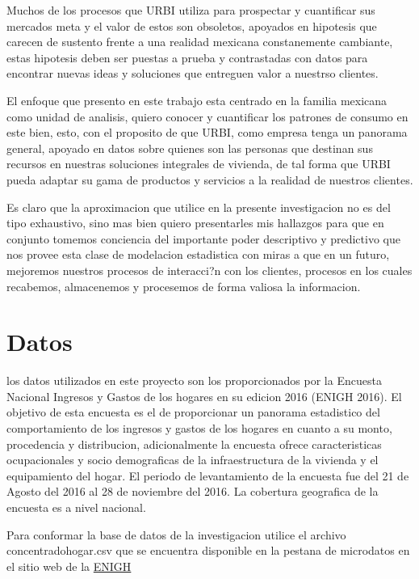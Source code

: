 \documentclass[]{book}
\begin{document}
Muchos de los procesos que URBI utiliza para prospectar y cuantificar
sus mercados meta y el valor de estos son obsoletos, apoyados en
hipotesis que carecen de sustento frente a una realidad mexicana
constanemente cambiante, estas hipotesis deben ser puestas a prueba y
contrastadas con datos para encontrar nuevas ideas y soluciones que
entreguen valor a nuestrso clientes.

El enfoque que presento en este trabajo esta centrado en la familia
mexicana como unidad de analisis, quiero conocer y cuantificar los
patrones de consumo en este bien, esto, con el proposito de que URBI,
como empresa tenga un panorama general, apoyado en datos sobre quienes
son las personas que destinan sus recursos en nuestras soluciones
integrales de vivienda, de tal forma que URBI pueda adaptar su gama de
productos y servicios a la realidad de nuestros clientes.

Es claro que la aproximacion que utilice en la presente investigacion no
es del tipo exhaustivo, sino mas bien quiero presentarles mis hallazgos
para que en conjunto tomemos conciencia del importante poder descriptivo
y predictivo que nos provee esta clase de modelacion estadistica con
miras a que en un futuro, mejoremos nuestros procesos de interacci?n con
los clientes, procesos en los cuales recabemos, almacenemos y procesemos
de forma valiosa la informacion.

\chapter{Datos}\label{datos}

los datos utilizados en este proyecto son los proporcionados por la
Encuesta Nacional Ingresos y Gastos de los hogares en su edicion 2016
(ENIGH 2016). El objetivo de esta encuesta es el de proporcionar un
panorama estadistico del comportamiento de los ingresos y gastos de los
hogares en cuanto a su monto, procedencia y distribucion, adicionalmente
la encuesta ofrece caracteristicas ocupacionales y socio demograficas de
la infraestructura de la vivienda y el equipamiento del hogar. El
periodo de levantamiento de la encuesta fue del 21 de Agosto del 2016 al
28 de noviembre del 2016. La cobertura geografica de la encuesta es a
nivel nacional.

Para conformar la base de datos de la investigacion utilice el archivo
concentradohogar.csv que se encuentra disponible en la pestana de
microdatos en el sitio web de la
\href{http://www.beta.inegi.org.mx/proyectos/enchogares/regulares/enigh/nc/2016/}{ENIGH}
\end{document}
